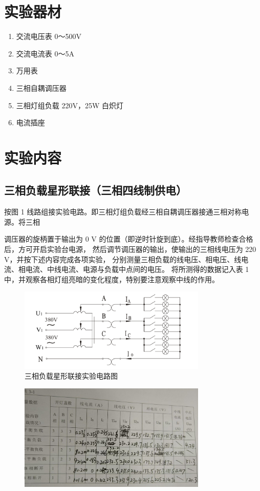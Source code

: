 \documentclass{article}
\begin{document}
\section{实验器材}
\label{sec:equipment}
    \begin{enumerate}
        \item 交流电压表  0～500V 
        \item 交流电流表 0～5A 
        \item 万用表
        \item 三相自耦调压器 
        \item 三相灯组负载 220V，25W 白炽灯 
        \item 电流插座
    \end{enumerate} 

\section{实验内容}
\subsection{三相负载星形联接（三相四线制供电） }
按图 1 线路组接实验电路。即三相灯组负载经三相自耦调压器接通三相对称电源。将三相

调压器的旋柄置于输出为 0 V 的位置（即逆时针旋到底）。经指导教师检查合格后，方可开启实验台电源，
然后调节调压器的输出，使输出的三相线电压为 220 V，并按下述内容完成各项实验，
分别测量三相负载的线电压、相电压、线电流、相电流、中线电流、电源与负载中点间的电压。
将所测得的数据记入表 1 中，并观察各相灯组亮暗的变化程度，特别要注意观察中线的作用。
\begin{figure}[H]
    \centering
    \includegraphics[width=0.8\textwidth]{img1.png}
    \caption{三相负载星形联接实验电路图}
    \label{fig:star_connection_circuit}
\end{figure}

\begin{figure}[H]
    \centering
    \includegraphics[width=0.8\textwidth]{table1.jpg}
\end{figure}
\end{document}
